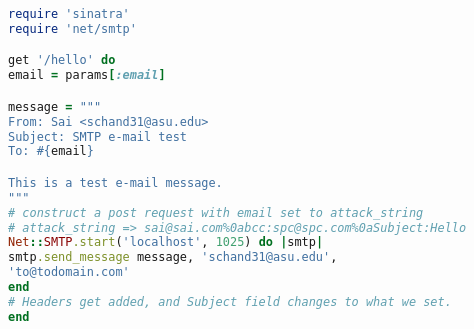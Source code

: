 \begin{lstlisting}[language=Ruby,caption={Ruby program with e-mail
      header injection vulnerability.},label={code:rubyemi}, float]
require 'sinatra'
require 'net/smtp'

get '/hello' do
email = params[:email]

message = """
From: Sai <schand31@asu.edu>
Subject: SMTP e-mail test
To: #{email}

This is a test e-mail message.
"""
# construct a post request with email set to attack_string
# attack_string => sai@sai.com%0abcc:spc@spc.com%0aSubject:Hello
Net::SMTP.start('localhost', 1025) do |smtp|
smtp.send_message message, 'schand31@asu.edu',
'to@todomain.com'
end
# Headers get added, and Subject field changes to what we set.
end
\end{lstlisting}
